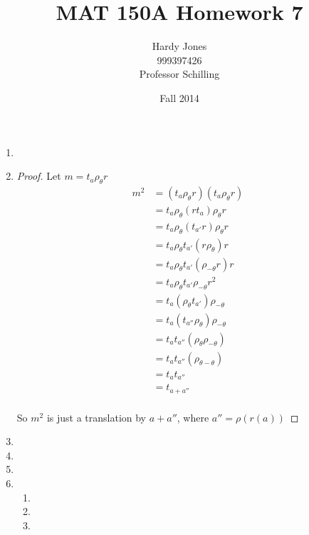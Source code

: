 \documentclass[12pt,letterpaper]{article}
\title{MAT 150A Homework 7\vspace{-2ex}}
\author{Hardy Jones\\
        999397426\\
        Professor Schilling\vspace{-2ex}}
\date{Fall 2014}
\begin{document}
  \maketitle

  \begin{enumerate}
    \item
    \item
      \begin{proof}
        Let $m = t_a \rho_\theta r$
        \begin{align*}
          m^2 &= (t_a \rho_\theta r)(t_a \rho_\theta r) \\
          &= t_a \rho_\theta (rt_a) \rho_\theta r \\
          &= t_a \rho_\theta (t_{a'}r) \rho_\theta r \\
          &= t_a \rho_\theta t_{a'}(r \rho_\theta) r \\
          &= t_a \rho_\theta t_{a'}( \rho_{-\theta} r) r \\
          &= t_a \rho_\theta t_{a'} \rho_{-\theta} r^2 \\
          &= t_a (\rho_\theta t_{a'}) \rho_{-\theta} \\
          &= t_a (t_{a''} \rho_\theta) \rho_{-\theta} \\
          &= t_a t_{a''} (\rho_\theta \rho_{-\theta}) \\
          &= t_a t_{a''} (\rho_{\theta - \theta}) \\
          &= t_a t_{a''} \\
          &= t_{a + a''} \\
        \end{align*}

        So $m^2$ is just a translation by $a + a''$,
        where $a'' = \rho(r(a))$
      \end{proof}
    \item
    \item
    \item
    \item
      \begin{enumerate}
        \item
        \item
        \item
      \end{enumerate}
  \end{enumerate}
\end{document}
